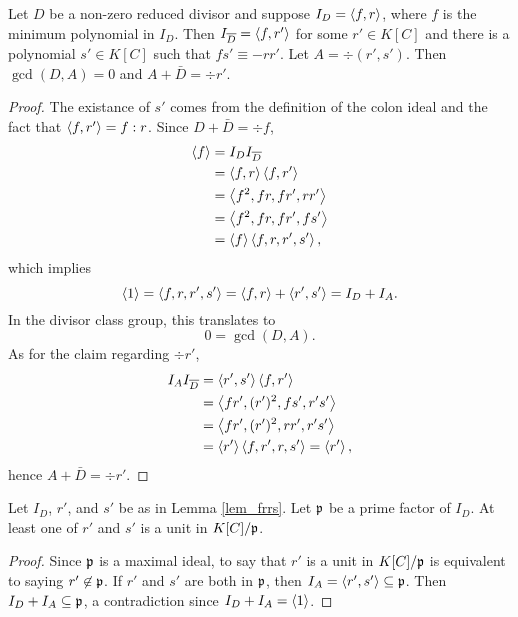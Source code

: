 \begin{lemma}
  \label{lem_frrs}
  Let $D$ be a non-zero reduced divisor
  and suppose $I_D = \left\langle f, r \right\rangle$, where $f$ is the minimum polynomial in $I_D$.
  Then $I_{\overline D} = \left\langle f, r' \right\rangle$ for some $r' \in K[C]$
  and there is a polynomial $s' \in K[C]$ such that $fs' \equiv -rr'$.
  Let $A = \div(r', s')$. Then $\gcd(D, A) = 0$ and $A + \bar D = \div r'$.
\end{lemma}
\begin{proof}
  The existance of $s'$ comes from the definition of the colon ideal and the fact that $\left\langle f,r' \right\rangle = f : r$.
  Since $D + \bar D = \div f$,
  \begin{align*}
    \left\langle f \right\rangle
      &= I_D I_{\overline D} \\
      &= \left\langle f, r \right\rangle \left\langle f, r' \right\rangle \\
      &= \left\langle f^2, fr, fr', rr' \right\rangle \\
      &= \left\langle f^2, fr, fr', fs' \right\rangle \\
      &= \left\langle f \right\rangle \left\langle f, r, r', s' \right\rangle,
  \end{align*}
  which implies
  \[ \left\langle 1 \right\rangle = \left\langle f, r, r', s' \right\rangle = \left\langle f, r \right\rangle + \left\langle r', s' \right\rangle = I_D + I_A. \]
  In the divisor class group, this translates to
  \[ 0 = \gcd(D, A). \]
  As for the claim regarding $\div r'$,
  \begin{align*}
    I_AI_{\overline D}
      &= \left\langle r', s' \right\rangle\left\langle f, r' \right\rangle \\
      &= \left\langle fr', (r')^2, fs', r's' \right\rangle \\
      &= \left\langle fr', (r')^2, rr', r's' \right\rangle \\
      &= \left\langle r' \right\rangle\left\langle f, r', r, s' \right\rangle = \left\langle r' \right\rangle,
  \end{align*}
  hence $A + \bar D = \div r'$.
\end{proof}

\begin{lemma}
  \label{lem_frrs2}
  Let $I_D$, $r'$, and $s'$ be as in Lemma \ref{lem_frrs}.
  Let $\frak p$ be a prime factor of $I_D$.
  At least one of $r'$ and $s'$ is a unit in $K[C]/\frak p$.
\end{lemma}
\begin{proof}
  Since $\frak p$ is a maximal ideal,
  to say that $r'$ is a unit in $K[C]/\frak p$ is equivalent to saying $r' \not\in \frak p$.
  If $r'$ and $s'$ are both in $\frak p$, then $I_A = \left\langle r', s' \right\rangle \subseteq \frak p$.
  Then $I_D + I_A \subseteq \frak p$, a contradiction since $I_D + I_A = \left\langle 1 \right\rangle$.
\end{proof}

